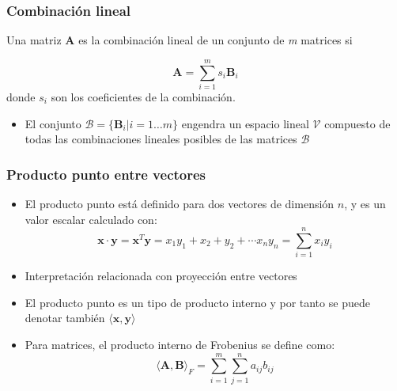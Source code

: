 \documentclass{beamer}
\begin{document}
\begin{frame}
\frametitle{Combinación lineal}
Una matriz $\boldsymbol{A}$ es la combinación lineal de un conjunto de \textit{m} matrices si 

\begin{equation*}
\boldsymbol{A}= \displaystyle \sum_{i=1}^{m} s_{i}\boldsymbol{B}_{i}
\end{equation*}
donde $s_{i}$ son los coeficientes de la combinación.
\begin{itemize}
 \item El conjunto $\mathcal{B}= \lbrace \boldsymbol{B}_{i} \vert i=1 \ldots m \rbrace$ engendra un espacio lineal $\mathcal{V}$ compuesto de todas las combinaciones lineales posibles de las matrices $\mathcal{B}$
\end{itemize} 
\end{frame}

\begin{frame}
\frametitle{Producto punto entre vectores}
\begin{itemize}
\item El producto punto está definido para dos vectores de dimensión $n$, y es un valor escalar calculado con:
\begin{equation*}
\boldsymbol{x} \cdot \boldsymbol{y} = \boldsymbol{x}^T  \boldsymbol{y}= x_{1}y_{1}+x_{2}+y_{2}+ \cdots x_{n}y_{n} = \sum_{i=1}^{n} x_{i}y_{i}
\end{equation*}
\item Interpretación relacionada con proyección entre vectores
\item El producto punto es un tipo de producto interno y por tanto se puede denotar también $\langle \boldsymbol{x}, \boldsymbol{y}\rangle$
\item Para matrices, el producto interno de Frobenius se define como:
\begin{equation*}
\langle \boldsymbol{A}, \boldsymbol{B}\rangle_{F} = \sum_{i=1}^{m}\sum_{j=1}^{n} a_{ij}b_{ij}
\end{equation*}
\end{itemize}
\end{frame}
\end{document}
